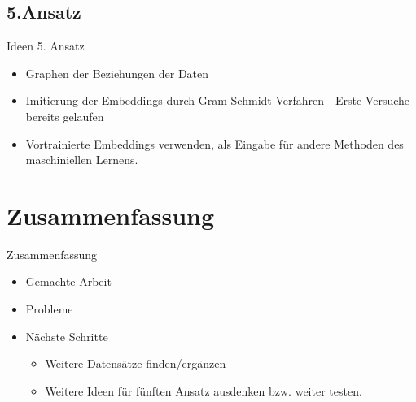 \documentclass[aspectratio=169]{beamer} %
\begin{document}
\subsection{5.Ansatz}
\begin{frame}
  Ideen 5. Ansatz
  \begin{itemize}
    \item Graphen der Beziehungen der Daten
    \item Imitierung der Embeddings durch Gram-Schmidt-Verfahren - Erste Versuche bereits gelaufen
    \item Vortrainierte Embeddings verwenden, als Eingabe f\"ur andere Methoden des maschiniellen Lernens.
  \end{itemize}
\end{frame}

\section{Zusammenfassung}
\begin{frame}
  Zusammenfassung
  \begin{itemize}
    \item Gemachte Arbeit
    \item Probleme
    \item N\"achste Schritte
    \begin{itemize}
    \item Weitere Datens\"atze finden/erg\"anzen
    \item Weitere Ideen f\"ur f\"unften Ansatz ausdenken bzw. weiter testen.
    \end{itemize}
  \end{itemize}
\end{frame}
\end{document}
